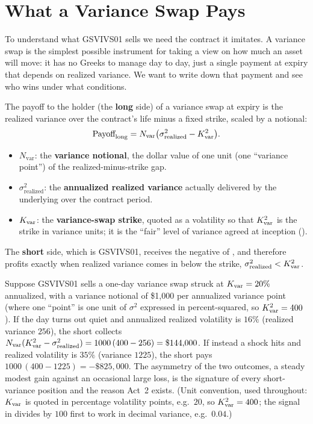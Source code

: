 \section{What a Variance Swap Pays}
\label{sec:gsvivs:varswap-payoff}

To understand what GSVIVS01 sells we need the contract it imitates. A variance swap is the simplest possible instrument for taking a view on how much an asset will move: it has no Greeks to manage day to day, just a single payment at expiry that depends on realized variance. We want to write down that payment and see who wins under what conditions.

The payoff to the holder (the \textbf{long} side) of a variance swap at expiry is the realized variance over the contract's life minus a fixed strike, scaled by a notional:
\begin{equation}
\label{eq:gsvivs:varswap-payoff}
\text{Payoff}_{\text{long}} = N_{\text{var}}\big(\sigma^2_{\text{realized}} - K_{\mathrm{var}}^2\big).
\end{equation}
\begin{itemize}
  \item $N_{\text{var}}$: the \textbf{variance notional}, the dollar value of one unit (one ``variance point'') of the realized-minus-strike gap.
  \item $\sigma^2_{\text{realized}}$: the \textbf{annualized realized variance} actually delivered by the underlying over the contract period.
  \item $K_{\mathrm{var}}$: the \textbf{variance-swap strike}, quoted as a volatility so that $K_{\mathrm{var}}^2$ is the strike in variance units; it is the ``fair'' level of variance agreed at inception ().
\end{itemize}
The \textbf{short} side, which is GSVIVS01, receives the negative of , and therefore profits exactly when realized variance comes in below the strike, $\sigma^2_{\text{realized}} < K_{\mathrm{var}}^2$.

\begin{workedexample}
Suppose GSVIVS01 sells a one-day variance swap struck at $K_{\mathrm{var}} = 20\%$ annualized, with a variance notional of \$1{,}000 per annualized variance point (where one ``point'' is one unit of $\sigma^2$ expressed in percent-squared, so $K_{\mathrm{var}}^2 = 400$). If the day turns out quiet and annualized realized volatility is $16\%$ (realized variance $256$), the short collects $N_{\text{var}}(K_{\mathrm{var}}^2 - \sigma^2_{\text{realized}}) = 1000\,(400 - 256) = \$144{,}000$. If instead a shock hits and realized volatility is $35\%$ (variance $1225$), the short pays $1000\,(400 - 1225) = -\$825{,}000$. The asymmetry of the two outcomes, a steady modest gain against an occasional large loss, is the signature of every short-variance position and the reason Act~2 exists. (Unit convention, used throughout: $K_{\mathrm{var}}$ is quoted in percentage volatility points, e.g.\ $20$, so $K_{\mathrm{var}}^2 = 400$; the signal in  divides by $100$ first to work in decimal variance, e.g.\ $0.04$.)
\end{workedexample}

